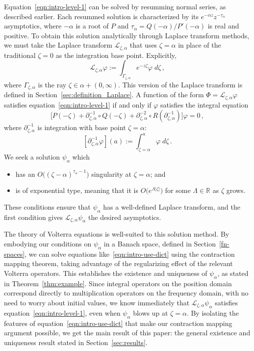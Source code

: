 \documentclass{article}
\theoremstyle{definition}
\theoremstyle{plain}
\newcommand{\R}{\mathbb{R}}
\newcommand{\laplace}{\mathcal{L}}
\newenvironment{revtwo}{\color{revred}}{\color{black}}
\newenvironment{revtwo}{}{}
\begin{document}
Equation~\eqref{eqn:intro-level-1} can be solved by resumming normal series, as described earlier. Each resummed solution is characterized by its $e^{-\alpha z} z^{-\tau_\alpha}$ asymptotics, where $-\alpha$ is a root of $P$ and $\tau_\alpha = Q(-\alpha)/P'(-\alpha)$ is real and positive. To obtain this solution analytically through Laplace transform methods, we must take the Laplace transform $\laplace_{\zeta,\alpha}$ that uses $\zeta = \alpha$ in place of the traditional $\zeta = 0$ as the integration base point. \begin{revtwo}
Explicitly,
\[ \laplace_{\zeta,\alpha} \varphi := \int_{\Gamma_{\zeta,\alpha}} e^{-z\zeta} \varphi\;d\zeta\,, \]
where $\Gamma_{\zeta,\alpha}$ is the ray $\zeta \in \alpha + (0, \infty)$.    
This version of the Laplace transform is defined in Section~\ref{sec:definition_Laplace}. A function of the form $\Phi = \laplace_{\zeta, \alpha} \varphi$ satisfies equation~\eqref{eqn:intro-level-1} if and only if $\varphi$ satisfies the integral equation
\[ \big[ P(-\zeta)+\partial_{\zeta,\alpha}^{-1}\circ Q(-\zeta)+\partial_{\zeta,\alpha}^{-2}\circ R(\partial_{\zeta,\alpha}^{-1}) \big] \varphi = 0\,, \]
where $\partial^{-1}_{\zeta, \alpha}$ is integration with base point $\zeta = \alpha$:
\[ [\partial^{-1}_{\zeta, \alpha} \varphi](a) := \int_{\zeta = \alpha}^a \varphi\;d\zeta\,. \]
We seek a solution $\psi_\alpha$ which
\begin{itemize}
\item has an $O\big((\zeta - \alpha)^{\tau_\alpha-1}\big)$ singularity at $\zeta = \alpha$; and
\item is of exponential type, meaning that it is $O\big(e^{\Lambda|\zeta|}\big)$ for some $\Lambda \in \R$ as $\zeta$ grows.
\end{itemize}
These conditions ensure that $\psi_\alpha$ has a well-defined Laplace transform, and the first condition gives $\laplace_{\zeta, \alpha} \psi_\alpha$ the desired asymptotics.
\end{revtwo}  

The theory of Volterra equations is well-suited to this solution method. By embodying our conditions on $\psi_\alpha$ in a Banach space, defined in Section~\ref{fn-spaces}, we can solve equations like~\eqref{eqn:intro-use-dict} using the contraction mapping theorem, taking advantage of the regularizing effect of the relevant Volterra operators. This establishes the existence and uniqueness of $\psi_\alpha$, as stated in Theorem~\ref{thm:example}. Since integral operators on the position domain correspond directly to multiplication operators on the frequency domain, with no need to worry about initial values, we know immediately that $\laplace_{\zeta, \alpha} \psi_\alpha$ satisfies equation~\eqref{eqn:intro-level-1}, even when $\psi_\alpha$ blows up at $\zeta = \alpha$. By isolating the features of equation~\eqref{eqn:intro-use-dict} that make our contraction mapping argument possible, we get the main result of this paper: the general existence and uniqueness result stated in Section~\ref{sec:results}.
\end{document}
